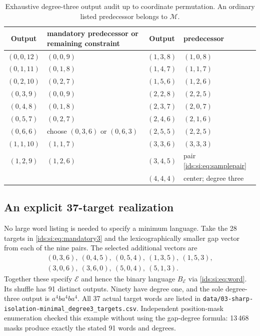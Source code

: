 \documentclass[11pt,letterpaper]{article}
\theoremstyle{definition}\newtheorem{definition}[theorem]{Definition}
\theoremstyle{remark}\newtheorem{remark}[theorem]{Remark}
\theoremstyle{definition}\newtheorem{question}[theorem]{Question}
\newcommand{\bpE}{\mathcal E}
\begin{document}
\begin{table}[htbp]
\centering\small
\caption{Exhaustive degree-three output audit up to coordinate permutation.
An ordinary listed predecessor belongs to $\mathcal M$.}
\label{ids:si:tab:degree3outputs}
\begin{tabular}{cl@{\qquad}cl}
\toprule
Output & mandatory predecessor or remaining constraint & Output & predecessor\\
\midrule
$(0,0,12)$ & $(0,0,9)$ & $(1,3,8)$ & $(1,0,8)$\\
$(0,1,11)$ & $(0,1,8)$ & $(1,4,7)$ & $(1,1,7)$\\
$(0,2,10)$ & $(0,2,7)$ & $(1,5,6)$ & $(1,2,6)$\\
$(0,3,9)$ & $(0,0,9)$ & $(2,2,8)$ & $(2,2,5)$\\
$(0,4,8)$ & $(0,1,8)$ & $(2,3,7)$ & $(2,0,7)$\\
$(0,5,7)$ & $(0,2,7)$ & $(2,4,6)$ & $(2,1,6)$\\
$(0,6,6)$ & choose $(0,3,6)$ or $(0,6,3)$ & $(2,5,5)$ & $(2,2,5)$\\
$(1,1,10)$ & $(1,1,7)$ & $(3,3,6)$ & $(3,3,3)$\\
$(1,2,9)$ & $(1,2,6)$ & $(3,4,5)$ & pair \eqref{ids:si:eq:samplepair}\\
 & & $(4,4,4)$ & center; degree three\\
\bottomrule
\end{tabular}
\end{table}

\subsection{An explicit 37-target realization}
No large word listing is needed to specify a minimum language. Take the
28 targets in \eqref{ids:si:eq:mandatory3} and the lexicographically smaller gap
vector from each of the nine pairs. The selected additional vectors are
\begin{equation}\label{ids:si:eq:selectednine}
\begin{gathered}
 (0,3,6),\ (0,4,5),\ (0,5,4),\ (1,3,5),\ (1,5,3),\\
 (3,0,6),\ (3,6,0),\ (5,0,4),\ (5,1,3).
\end{gathered}
\end{equation}
Together these specify $\bpE$ and hence the binary language $B_{\bpE}$ via
\eqref{ids:si:eq:word}. Its shuffle has 91 distinct outputs. Ninety have degree
one, and the sole degree-three output is $a^4ba^4ba^4$.
All 37 actual target words are listed in
\nolinkurl{data/03-sharp-isolation-minimal_degree3_targets.csv}. Independent
position-mask enumeration checked this example without using the gap-degree
formula: 13\,468 masks produce exactly the stated 91 words and degrees.
\end{document}
